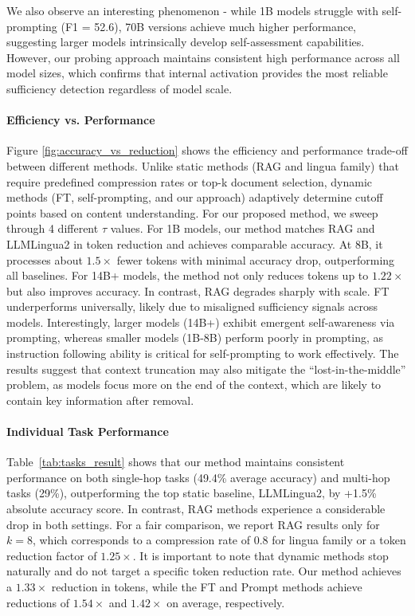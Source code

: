 We also observe an interesting phenomenon - while 1B models struggle with self-prompting (F1 = 52.6), 70B versions achieve much higher performance, suggesting larger models intrinsically develop self-assessment capabilities. However, our probing approach maintains consistent high performance across all model sizes, which confirms that internal activation provides the most reliable sufficiency detection regardless of model scale. 

\paragraph{Efficiency vs. Performance}
\label{sec:short_results}
Figure \ref{fig:accuracy_vs_reduction} shows the efficiency and performance trade-off between different methods. Unlike static methods (RAG and lingua family) that require predefined compression rates or top-k document selection, dynamic methods (FT, self-prompting, and our approach) adaptively determine cutoff points based on content understanding. For our proposed method, we sweep through 4 different $\tau$ values. For 1B models, our method matches RAG and LLMLingua2 in token reduction and achieves comparable accuracy. At 8B, it processes about $1.5\times$ fewer tokens with minimal accuracy drop, outperforming all baselines. For 14B+ models, the method not only reduces tokens up to $1.22\times$ but also improves accuracy.
In contrast, RAG degrades sharply with scale. FT underperforms universally, likely due to misaligned sufficiency signals across models. Interestingly, larger models (14B+) exhibit emergent self-awareness via prompting, whereas smaller models (1B-8B) perform poorly in prompting, as instruction following ability is critical for self-prompting to work effectively. The results suggest that context truncation may also mitigate the ``lost-in-the-middle'' problem, as models focus more on the end of the context, which are likely to contain key information after removal. 




\paragraph{Individual Task Performance}
\label{sec:tasks_result}
Table~\ref{tab:tasks_result} shows that our method maintains consistent performance on both single-hop tasks (49.4\% average accuracy) and multi-hop tasks (29\%), outperforming the top static baseline, LLMLingua2, by +1.5\% absolute accuracy score. In contrast, RAG methods experience a considerable drop in both settings. For a fair comparison, we report RAG results only for $k=8$, which corresponds to a compression rate of $0.8$ for lingua family or a token reduction factor of $1.25\times$. It is important to note that dynamic methods stop naturally and do not target a specific token reduction rate. Our method achieves a $1.33\times$ reduction in tokens, while the FT and Prompt methods achieve reductions of $1.54\times$ and $1.42\times$ on average, respectively. 


